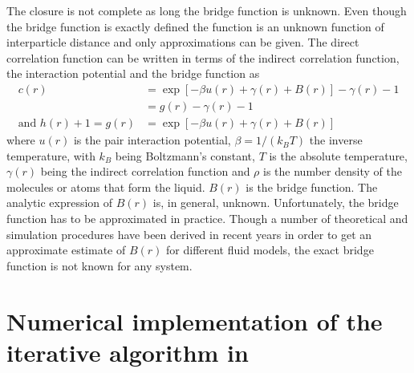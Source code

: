  The closure is not complete as long the bridge function is
unknown. Even though the bridge function is exactly defined the
function is an unknown function of interparticle distance and only
approximations can be given. The direct correlation function can be
written in terms of the indirect correlation function, the
interaction potential and the bridge function as
\begin{align}\label{eq:ozclosure}
c(r)&= \exp\left[ -\beta u(r) +\gamma(r)+B(r)\right] - \gamma(r)-1 \\
    &= g(r)- \gamma(r)-1 \nonumber \\
\mbox{and } h(r)+1=g(r)&= \exp\left[ -\beta u(r)
+\gamma(r)+B(r)\right] \label{eq:ozg(r)}
\end{align}
where $u(r)$ is the pair interaction potential, $\beta=1/(k_B T)$
the inverse temperature, with $k_B$ being Boltzmann’s constant, $T$
is the absolute temperature, $\gamma(r)$ being the indirect
correlation function and $\rho$ is the number density of the
molecules or atoms that form the liquid. $B(r)$ is the bridge
function. The analytic expression of $B(r)$ is, in general, unknown.
Unfortunately, the bridge function has to be approximated in
practice. Though a number of theoretical and simulation procedures
have been derived in recent years in order to get an approximate
estimate of $B(r)$ for different fluid models, the exact bridge
function is not known for any system.

\section{Numerical implementation of the iterative algorithm in \SASfit}

